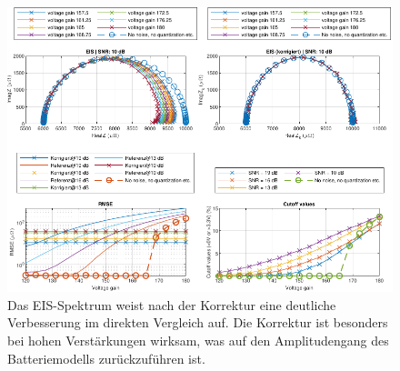 \begin{figure}[hbt!]
	\centering
	\includegraphics[width=.99\textwidth]{../img/ergebnisse.pdf}
	\caption{Das EIS-Spektrum weist nach der Korrektur eine deutliche Verbesserung im direkten Vergleich auf. Die Korrektur ist besonders bei hohen Verstärkungen wirksam, was auf den Amplitudengang des Batteriemodells zurückzuführen ist.}
	\label{fig:Ergebnisse} 
\end{figure}
   

